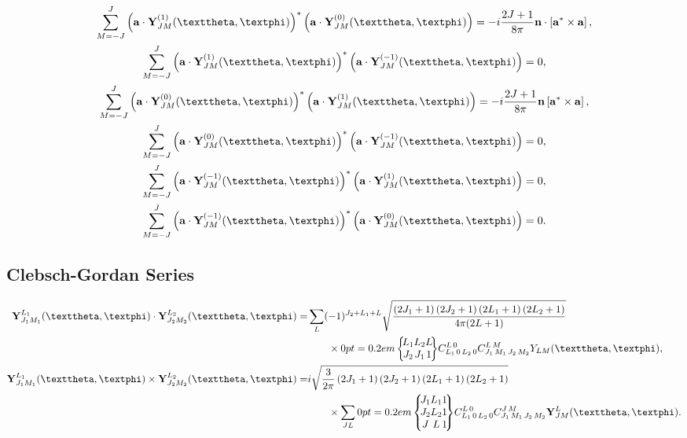 \begin{enumerate}[label=(\alph*)]
\begin{gather}
\sum_{M=-J}^{J}\left(\vect{a} \cdot \vect{Y}_{J M}^{(1)}(\vartheta, \varphi)\right)^{*}\left(\vect{a} \cdot \vect{Y}_{J M}^{(0)}(\vartheta, \varphi)\right)=-i \frac{2 J+1}{8 \pi} \vect{n} \cdot\left[\vect{a}{ }^{*} \times \vect{a}\right], \label{eq:7:3:94}\\
\sum_{M=-J}^{J}\left(\vect{a} \cdot \vect{Y}_{J M}^{(1)}(\vartheta, \varphi)\right)^{*}\left(\vect{a} \cdot \vect{Y}_{J M}^{(-1)}(\vartheta, \varphi)\right)=0, \label{eq:7:3:95}\\
\sum_{M=-J}^{J}\left(\vect{a} \cdot \vect{Y}_{J M}^{(0)}(\vartheta, \varphi)\right)^{*}\left(\vect{a} \cdot \vect{Y}_{J M}^{(1)}(\vartheta, \varphi)\right)=-i \frac{2 J+1}{8 \pi} \vect{n}\left[\vect{a}^{*} \times \vect{a}\right], \label{eq:7:3:96}\\
\sum_{M=-J}^{J}\left(\vect{a} \cdot \vect{Y}_{J M}^{(0)}(\vartheta, \varphi)\right)^{*}\left(\vect{a} \cdot \vect{Y}_{J M}^{(-1)}(\vartheta, \varphi)\right)=0, \label{eq:7:3:97}\\
\sum_{M=-J}^{J}\left(\vect{a} \cdot \vect{Y}_{J M}^{(-1)}(\vartheta, \varphi)\right)^{*}\left(\vect{a} \cdot \vect{Y}_{J M}^{(1)}(\vartheta, \varphi)\right)=0, \label{eq:7:3:98}\\
\sum_{M=-J}^{J}\left(\vect{a} \cdot \vect{Y}_{J M}^{(-1)}(\vartheta, \varphi)\right)^{*}\left(\vect{a} \cdot \vect{Y}_{J M}^{(0)}(\vartheta, \varphi)\right)=0 . \label{eq:7:3:99}
\end{gather}
\end{enumerate}
\subsection{Clebsch-Gordan Series}\label{sec:7.3.10}
\begin{align}
\vect{Y}_{J_{1} M_{1}}^{L_{1}}(\vartheta, \varphi) \cdot \vect{Y}_{J_{2} M_{2}}^{L_{2}}(\vartheta, \varphi)  =&\sum_{L}(-1)^{J_{2}+L_{1}+L} \sqrt{\frac{\left(2 J_{1}+1\right)\left(2 J_{2}+1\right)\left(2 L_{1}+1\right)\left(2 L_{2}+1\right)}{4 \pi(2 L+1)}}
\notag\\&\qquad \times
\sixj{L_{1}}{L_{2}}{L}{J_{2}}{J_{1}}{1} \clebsch{L_{1}}{0}{L_{2}}{0}{L}{0} \clebsch{J_{1}}{M_{1}}{J_{2}}{M_{2}}{L}{M} Y_{L M}(\vartheta, \varphi), \label{eq:7:3:100}\\
 \vect{Y}_{J_{1} M_{1}}^{L_{1}}(\vartheta, \varphi) \times \vect{Y}_{J_{2} M_{2}}^{L_{2}}(\vartheta, \varphi)=&i \sqrt{\frac{3}{2 \pi}\left(2 J_{1}+1\right)\left(2 J_{2}+1\right)\left(2 L_{1}+1\right)\left(2 L_{2}+1\right)}  \notag\\
& \qquad\times \sum_{J L}
\ninej{J_{1}} {L_{1}} {1}{J_{2}} {L_{2}}{ 1 }{J}{ L}{1}
\clebsch{L_{1}}{0}{L_{2}}{0}{L}{0} \clebsch{J_{1}}{M_{1}}{J_{2}}{M_{2}}{J}{M} \vect{Y}_{J M}^{L}(\vartheta, \varphi) . \label{eq:7:3:101}
\end{align}
